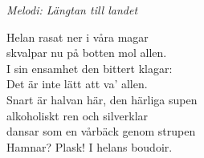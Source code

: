 {\footnotesize\textit{Melodi: Längtan till landet}}\par
\vspace{10pt}
Helan rasat ner i våra magar\\
skvalpar nu på botten mol allen.\\
I sin ensamhet den bittert klagar:\\
Det är inte lätt att va' allen.\\
Snart är halvan här, den härliga supen\\
alkoholiskt ren och silverklar\\
dansar som en vårbäck genom strupen\\
Hamnar? Plask! I helans boudoir.
